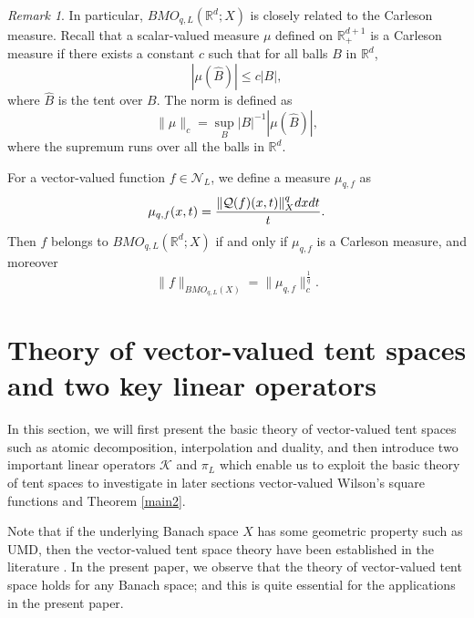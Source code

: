 \documentclass[oneside,english,a4wide]{amsart}
\numberwithin{equation}{section}
\numberwithin{figure}{section}
\theoremstyle{plain}
\theoremstyle{plain}
\theoremstyle{definition}
\theoremstyle{plain}
\theoremstyle{remark}
\theoremstyle{definition}
\theoremstyle{remark}
\newtheorem{remark}[thm]{Remark}
\theoremstyle{definition}
\newcommand{\real}{{\mathbb R}}
\newcommand{\N}{{\mathcal N}}
\newcommand{\Q}{{\mathcal Q}}
\newcommand{\8}{+\infty}
\renewcommand{\1}{\mathbbm{1}}
\newcommand{\wh}{\widehat}
\renewcommand\d{{\rm d}}
\begin{document}
{\begin{remark}
    In particular, $BMO_{q, L}(\real^d; X)$ is closely related to the Carleson measure. Recall that a scalar-valued measure $ \mu $ defined on $ \real^{d+1}_+ $ is a Carleson measure if there exists a constant $ c $ such that for all balls $ B $ in $ \real^d $,
    \[
        |\mu(\wh{B})| \leq c|B|,
    \]
    where $ \wh{B} $ is the tent over $ B $. The norm is defined as
    \[
        \| \mu \|_c = \sup_{B} |B|^{-1} |\mu( \wh{B} )|,
    \]
    where the supremum runs over all the balls in $\real^d$.

    For a vector-valued function $f \in \N_L$, we define a measure $\mu_{q, f}$ as
    \[
        \mu_{q, f}(x, t) = \frac{\| \Q(f)(x,t) \|_X^q \d x\d t }{t}.
    \]
    Then $f$ belongs to $ BMO_{q,L}(\real^d; X)$ if and only if $\mu_{q, f}$ is a Carleson measure, and moreover
    \[
        \| f \|_{BMO_{q, L}(X)} = \| \mu_{q, f} \|^{\frac{1}{q}}_c.
    \]
\end{remark}
    


\section{Theory of vector-valued tent spaces and two key linear operators}\label{Tentspace}
In this section, we will first present the basic theory of vector-valued tent spaces such as atomic decomposition, interpolation and duality, and then introduce two important linear operators $\mathcal K$ and $\pi_L$ which enable us to exploit the basic theory of tent spaces to investigate in later sections vector-valued Wilson's square functions and Theorem \ref{main2}. %

Note that if the underlying Banach space $X$ has some geometric property such as UMD, then the vector-valued tent space theory have been established in the literature \cite{Hytonen2008, Kemppainen2014,Kemppainen2016}. In the present paper, we observe that the theory of vector-valued tent space holds for any Banach space; and this is quite essential for the applications in the present paper.  

}
\end{document}
